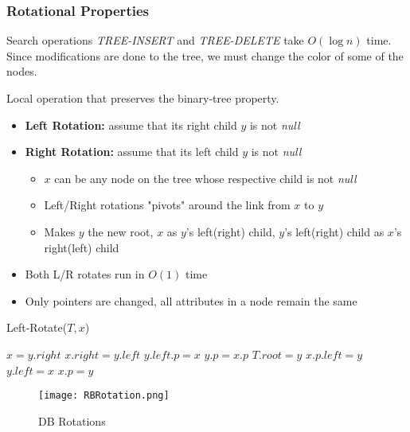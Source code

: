 \documentclass[10pt, 
a4paper, 
oneside, 
headinclude, footinclude, 
BCOR5mm]
{scrartcl}
\begin{document}
\subsubsection{Rotational Properties}
Search operations \textit{TREE-INSERT} and \textit{TREE-DELETE} take $O(\log n)$ time. Since modifications are done to the tree, we must change the color of some of the nodes.
\begin{definition}
    Local operation that preserves the binary-tree property. 
    \begin{itemize}
        \item \textbf{Left Rotation:} assume that its right child $y$ is not \textit{null} 
        \item \textbf{Right Rotation:} assume that its left child $y$ is not \textit{null}
        \begin{itemize}
            \item $x$ can be any node on the tree whose respective child is not \textit{null}
            \item Left/Right rotations "pivots" around the link from $x$ to $y$
            \item Makes $y$ the new root, $x$ as $y$'s left(right) child, $y$'s left(right) child as $x$'s right(left) child
        \end{itemize}
        \item Both L/R rotates run in $O(1)$ time
        \item Only pointers are changed, all attributes in a node remain the same
    \end{itemize}
\end{definition}
\begin{algorithm}
    \caption{Left-Rotate($T,x$)}

    $x = y.right$ 
    $x.right = y.left$ 
        {$y.left.p = x$\;}
    $y.p = x.p$\;
        {$T.root = y$\;}
        {$x.p.left = y$\;}
    $y.left = x$\;
    $x.p = y$\;
\end{algorithm}
\begin{figure}[H]
    \begin{center}
        \texttt{[image: RBRotation.png]}
        \caption{DB Rotations}
    \end{center}
\end{figure}
\end{document}
